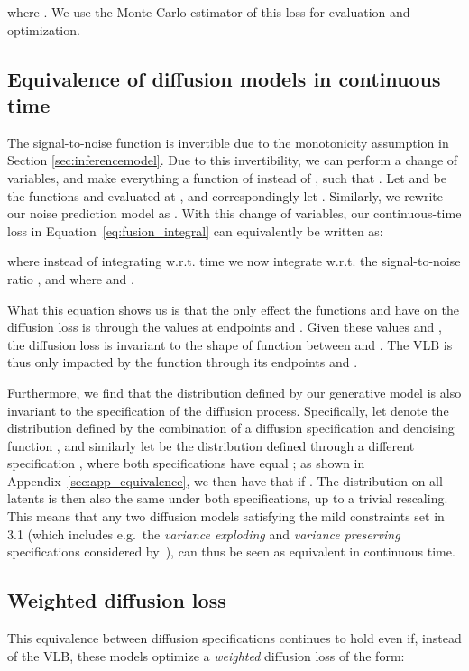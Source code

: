 \documentclass{article}
\def\Eqref#1{Equation~\ref{#1}}
\begin{document}
where . We use the Monte Carlo estimator of this loss for evaluation and optimization.






\subsection{Equivalence of diffusion models in continuous time}
\label{sec:schedule_invariance}
The signal-to-noise function  is invertible due to the monotonicity assumption in Section \ref{sec:inferencemodel}. Due to this invertibility, we can perform a change of variables, and make everything a function of  instead of , such that . Let  and  be the functions  and  evaluated at , and correspondingly let . Similarly, we rewrite our noise prediction model as . With this change of variables, our continuous-time loss in \Eqref{eq:fusion_integral} can equivalently be written as:

where instead of integrating w.r.t. time  we now integrate w.r.t. the signal-to-noise ratio , and where  and .

What this equation shows us is that the only effect the functions  and  have on the diffusion loss is through the values  at endpoints  and . Given these values  and , the diffusion loss is invariant to the shape of function  between  and . The VLB is thus only impacted by the function  through its endpoints  and . 

Furthermore, we find that the distribution  defined by our generative model is also invariant to the specification of the diffusion process. Specifically, let  denote the distribution defined by the combination of a diffusion specification and denoising function , and similarly let  be the distribution defined through a different specification , where both specifications have equal ; as shown in Appendix~\ref{sec:app_equivalence}, we then have that  if . The distribution on all latents  is then also the same under both specifications, up to a trivial rescaling. This means that any two diffusion models satisfying the mild constraints set in 3.1 (which includes e.g.\ the \emph{variance exploding} and \emph{variance preserving} specifications considered by~\cite{song2020score}), can thus be seen as equivalent in continuous time.

\subsection{Weighted diffusion loss}
This equivalence between diffusion specifications continues to hold even if, instead of the VLB, these models optimize a \emph{weighted} diffusion loss of the form:
\end{document}

